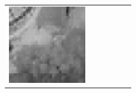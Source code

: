 \documentclass[11pt,a4paper,openright,oneside]{book}
\numberwithin{equation}{section}
\begin{document}
{\begin{figure}[h]
\begin{adjustwidth}{-3cm}{-3cm}
\begin{tabular}{>{\centering\arraybackslash}m{1.5cm} m{2.5cm} m{2.5cm} m{2.5cm} m{2.5cm} m{2.5cm}}
        \includegraphics[width=\linewidth]{media/tnale/AAAfruits-comp5-ale-2.png} \\
         

\end{tabular}
\end{adjustwidth}
\end{figure}}
\end{document}
